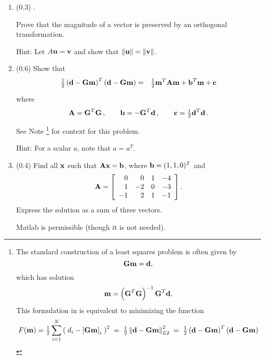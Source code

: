 \documentclass[11pt,titlepage,fleqn]{article}
\begin{document}
\begin{enumerate}

\item (0.3) \citep[][p.~473, P10]{SteinWysession}.

Prove that the magnitude of a vector is preserved by an orthogonal transformation.

Hint: Let $A\mbox{${\bf u}$} = \mbox{${\bf v}$}$ and show that $\|\mbox{${\bf u}$}\| = \|\mbox{${\bf v}$}\|$.


\item (0.6) Show that 
%
\begin{eqnarray}
\hlf \left( \bd - \bG\bem \right)^T \left( \bd - \bG\bem \right)
&=& \hlf \bem^T\bA\bem + \bb^T\bem + \bc
\label{lsq1}
\end{eqnarray}
%
where
%
\begin{equation}
\bA = \bG^T\bG
\,,\hspace{20pt}
\bb = -\bG^T\bd
\,,\hspace{20pt}
\bc = \hlf\bd^T\bd
\,.
\end{equation}
%
See Note \footnote{The standard construction of a least squares problem is often given by
%
\begin{equation}
\mbox{${\bf G}$}\mbox{${\bf m}$} = \mbox{${\bf d}$},
\label{lsq}
\end{equation}
%
which has solution
%
\begin{equation}
\mbox{${\bf m}$} = \left( \mbox{${\bf G}$}^T\mbox{${\bf G}$} \right)^{-1} \mbox{${\bf G}$}^T \mbox{${\bf d}$}.
\label{lsq_sol}
\end{equation}
%
This formulation in  is equivalent to minimizing the function
%
\begin{equation}
F(\bem) = \hlf \sum_{i=1}^N \left(\;d_i - \left[ \bG\bem \right]_i \;\right)^2
\;=\; \hlf \left\| \bd  - \bG\bem \right\|_{L2}^2
\;=\; \hlf \left( \bd  - \bG\bem \right)^T \left( \bd - \bG\bem \right)
\end{equation}
}
for context for this problem.

Hint: For a scalar $a$, note that $a = a^T$.


\item (0.4) Find all $\mbox{${\bf x}$}$ such that $\mbox{${\bf A}$}\mbox{${\bf x}$} = \mbox{${\bf b}$}$, where $\mbox{${\bf b}$} = (1, 1, 0)^T$ and
%
\begin{eqnarray*}
\mbox{${\bf A}$} =  \left[ \begin{array}{rrrr}
     0  &   0  &   1 & -4 \\
     1  &   -2  &   0 & -3 \\
     -1  &   2  &   1 & -1 \\
\end{array} \right].
\end{eqnarray*}
%
Express the solution as a sum of three vectors.

Matlab is permissible (though it is not needed).

\end{enumerate}
\end{document}
